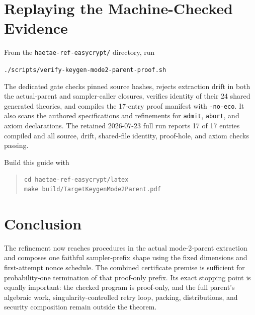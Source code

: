 \documentclass[11pt]{article}
\theoremstyle{definition}
\theoremstyle{plain}
\theoremstyle{remark}
\newcommand{\code}[1]{\nolinkurl{#1}}
\begin{document}
\section{Replaying the Machine-Checked Evidence}

From the \code{haetae-ref-easycrypt/} directory, run
\begin{center}
\code{./scripts/verify-keygen-mode2-parent-proof.sh}
\end{center}
The dedicated gate checks pinned source hashes, rejects extraction drift in
both the actual-parent and sampler-caller closures, verifies identity of their
24 shared generated theories, and compiles the 17-entry proof manifest with
\code{-no-eco}.  It also scans the authored specifications and refinements for
\code{admit}, \code{abort}, and axiom declarations.  The retained 2026-07-23
full run reports 17 of 17 entries compiled and all source, drift, shared-file
identity, proof-hole, and axiom checks passing.

Build this guide with
\begin{quote}
\begin{verbatim}
cd haetae-ref-easycrypt/latex
make build/TargetKeygenMode2Parent.pdf
\end{verbatim}
\end{quote}

\section*{Conclusion}

The refinement now reaches procedures in the actual mode-2-parent extraction
and composes one faithful sampler-prefix shape using the fixed dimensions and
first-attempt nonce schedule.  The combined certificate premise is sufficient
for probability-one termination of that proof-only prefix.  Its exact stopping
point is equally important: the checked program is proof-only, and the full
parent's algebraic work, singularity-controlled retry loop, packing,
distributions, and security composition remain outside the theorem.
\end{document}
